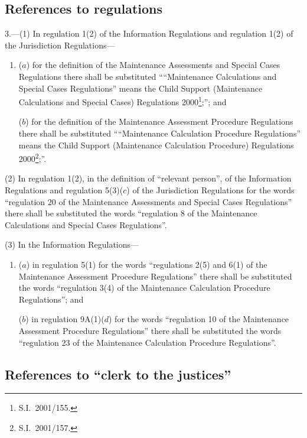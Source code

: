 \documentclass[12pt,a4paper]{article}
\begin{document}
\subsection[3. References to regulations]{References to regulations}

3.---(1)  In regulation 1(2) of the Information Regulations and regulation 1(2) of the Jurisdiction Regulations—
\begin{enumerate}\item[]
($a$) for the definition of the Maintenance Assessments and Special Cases Regulations there shall be substituted ““Maintenance Calculations and Special Cases Regulations” means the Child Support (Maintenance Calculations and Special Cases) Regulations 2000\footnote{S.I.\ 2001/155.};”; and

($b$) for the definition of the Maintenance Assessment Procedure Regulations there shall be substituted ““Maintenance Calculation Procedure Regulations” means the Child Support (Maintenance Calculation Procedure) Regulations 2000\footnote{S.I.\ 2001/157.};”.
\end{enumerate}

(2) In regulation 1(2), in the definition of “relevant person”, of the Information Regulations and regulation 5(3)($c$)  of the Jurisdiction Regulations for the words “regulation 20 of the Maintenance Assessments and Special Cases Regulations” there shall be substituted the words “regulation 8 of the Maintenance Calculations and Special Cases Regulations”.

(3) In the Information Regulations—
\begin{enumerate}\item[]
($a$) in regulation 5(1) for the words “regulations 2(5) and 6(1) of the Maintenance Assessment Procedure Regulations” there shall be substituted the words “regulation 3(4) of the Maintenance Calculation Procedure Regulations”; and

($b$) in regulation 9A(1)($d$)  for the words “regulation 10 of the Maintenance Assessment Procedure Regulations” there shall be substituted the words “regulation 23 of the Maintenance Calculation Procedure Regulations”.
\end{enumerate}

\subsection[4. References to “clerk to the justices”]{References to “clerk to the justices”}
\end{document}
